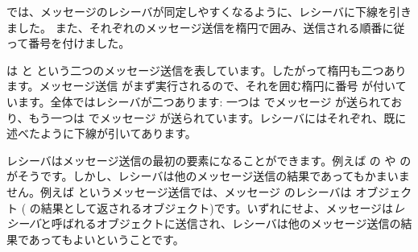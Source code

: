\documentclass[a4paper,10pt,twoside]{book}
\begin{document}


 では、メッセージのレシーバが同定しやすくなるように、レシーバに下線を引きました。
また、それぞれのメッセージ送信を楕円で囲み、送信される順番に従って番号を付けました。


 は と  という二つのメッセージ送信を表しています。したがって楕円も二つあります。メッセージ送信  がまず実行されるので、それを囲む楕円に番号  が付いています。全体ではレシーバが二つあります: 一つは  でメッセージ  が送られており、もう一つは  でメッセージ  が送られています。レシーバにはそれぞれ、既に述べたように下線が引いてあります。

レシーバはメッセージ送信の最初の要素になることができます。例えば  の  や  の  がそうです。しかし、レシーバは他のメッセージ送信の結果であってもかまいません。例えば  というメッセージ送信では、メッセージ  のレシーバは  オブジェクト ( の結果として返されるオブジェクト)です。いずれにせよ、メッセージは\emph{レシーバ}と呼ばれるオブジェクトに送信され、レシーバは他のメッセージ送信の結果であってもよいということです。
\end{document}
